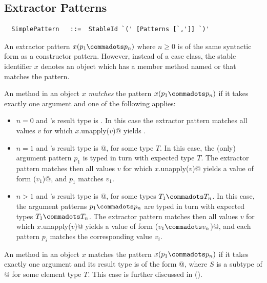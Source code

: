 \subsection{Extractor Patterns}\label{sec:extractor-patterns}

\syntax\begin{lstlisting}
  SimplePattern   ::=  StableId `(' [Patterns [`,']] `)'
\end{lstlisting}

An extractor pattern $x(p_1 \commadots p_n)$ where $n \geq 0$ is of
the same syntactic form as a constructor pattern. However, instead of
a case class, the stable identifier $x$ denotes an object which has a
member method named  or  that matches
the pattern.

An  method in an object $x$ {\em matches} the pattern
$x(p_1 \commadots p_n)$ if it takes exactly one argument and one of
the following applies:
\begin{itemize}
\item[]
$n=0$ and 's result type is . In this case
the extractor pattern matches all values $v$ for which 
\lstinline@$x$.unapply($v$)@ yields .
\item[]
$n=1$ and 's result type is \lstinline@Option[$T$]@, for some
type $T$.  In this case, the (only) argument pattern $p_1$ is typed in
turn with expected type $T$.  The extractor pattern matches then all
values $v$ for which \lstinline@$x$.unapply($v$)@ yields a value of form
\lstinline@Some($v_1$)@, and $p_1$ matches $v_1$.
\item[]
$n>1$ and 's result type is 
\lstinline@Option[{$T_1 \commadots T_n$}]@, for some
types $T_1 \commadots T_n$.  In this case, the argument patterns $p_1
\commadots p_n$ are typed in turn with expected types $T_1 \commadots
T_n$.  The extractor pattern matches then all values $v$ for which
\lstinline@$x$.unapply($v$)@ yields a value of form
\lstinline@Some({$v_1 \commadots v_n$})@, and each pattern
$p_i$ matches the corresponding value $v_i$.
\end{itemize}

An  method in an object $x$ matches the pattern
$x(p_1 \commadots p_n)$ if it takes exactly one argument and its
result type is of the form \lstinline@Option[$S$]@, where $S$ is a subtype of
\lstinline@Seq[$T$]@ for some element type $T$. 
This case is further discussed in ().


